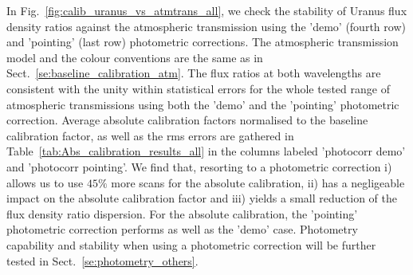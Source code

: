 In Fig.~\ref{fig:calib_uranus_vs_atmtrans_all}, we check the stability
of Uranus flux density ratios against the atmospheric transmission using
the 'demo' (fourth row) and 'pointing' (last row) photometric
corrections. The atmospheric transmission model and the colour
conventions are the same as in Sect.~\ref{se:baseline_calibration_atm}.
The flux ratios at both wavelengths are consistent with the
unity within statistical errors for the whole tested range of
atmospheric transmissions using both the 'demo' and the 'pointing'
photometric correction. Average absolute calibration factors normalised
to the baseline calibration factor, as well as the  rms errors are
gathered in Table~\ref{tab:Abs_calibration_results_all} in the columns
labeled 'photocorr demo' and 'photocorr pointing'. We find that,
resorting to a photometric correction i) allows us to use $45\%$ more
scans for the absolute calibration, ii) has a negligeable impact on
the absolute calibration factor and iii) yields a small reduction of
the flux density ratio dispersion. For the absolute calibration, the
'pointing' photometric correction performs as well as the 'demo' case.
Photometry capability and stability when using a photometric
correction will be further tested in Sect.~\ref{se:photometry_others}. 





